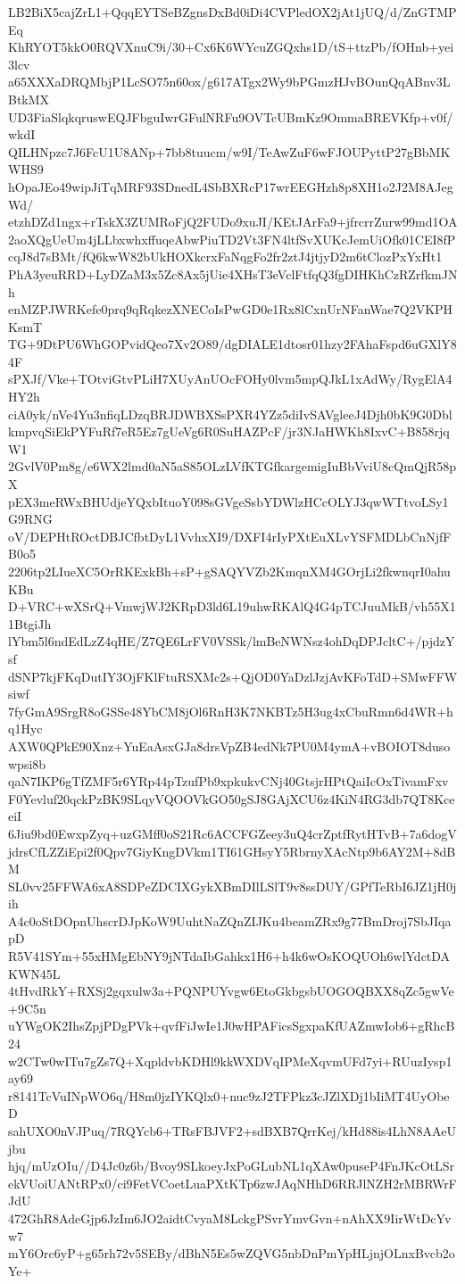 LB2BiX5cajZrL1+QqqEYTSeBZgnsDxBd0iDi4CVPledOX2jAt1jUQ/d/ZnGTMPEq
KhRYOT5kkO0RQVXnuC9i/30+Cx6K6WYcuZGQxhs1D/tS+ttzPb/fOHnb+yei3lcv
a65XXXaDRQMbjP1LcSO75n60ox/g617ATgx2Wy9bPGmzHJvBOunQqABnv3LBtkMX
UD3FiaSlqkqruswEQJFbguIwrGFulNRFu9OVTcUBmKz9OmmaBREVKfp+v0f/wkdI
QILHNpzc7J6FcU1U8ANp+7bb8tuucm/w9I/TeAwZuF6wFJOUPyttP27gBbMKWHS9
hOpaJEo49wipJiTqMRF93SDnedL4SbBXRcP17wrEEGHzh8p8XH1o2J2M8AJegWd/
etzhDZd1ngx+rTskX3ZUMRoFjQ2FUDo9xuJI/KEtJArFa9+jfrcrrZurw99md1OA
2aoXQgUeUm4jLLbxwhxffuqeAbwPiuTD2Vt3FN4ltfSvXUKcJemUiOfk01CEI8fP
cqJ8d7sBMt/fQ6kwW82bUkHOXkcrxFaNqgFo2fr2ztJ4jtjyD2m6tClozPxYxHt1
PhA3yeuRRD+LyDZaM3x5Zc8Ax5jUie4XHsT3eVclFtfqQ3fgDIHKhCzRZrfkmJNh
enMZPJWRKefe0prq9qRqkezXNECoIsPwGD0e1Rx8lCxnUrNFanWae7Q2VKPHKsmT
TG+9DtPU6WhGOPvidQeo7Xv2O89/dgDIALE1dtosr01hzy2FAhaFspd6uGXlY84F
sPXJf/Vke+TOtviGtvPLiH7XUyAnUOcFOHy0lvm5mpQJkL1xAdWy/RygElA4HY2h
ciA0yk/nVe4Yu3nfiqLDzqBRJDWBXSsPXR4YZz5diIvSAVgleeJ4Djh0bK9G0Dbl
kmpvqSiEkPYFuRf7eR5Ez7gUeVg6R0SuHAZPcF/jr3NJaHWKh8IxvC+B858rjqW1
2GvlV0Pm8g/e6WX2lmd0aN5aS85OLzLVfKTGfkargemigIuBbVviU8cQmQjR58pX
pEX3meRWxBHUdjeYQxbItuoY098sGVgeSsbYDWlzHCcOLYJ3qwWTtvoLSy1G9RNG
oV/DEPHtROctDBJCfbtDyL1VvhxXI9/DXFI4rIyPXtEuXLvYSFMDLbCnNjfFB0o5
2206tp2LIueXC5OrRKExkBh+sP+gSAQYVZb2KmqnXM4GOrjLi2fkwnqrI0ahuKBu
D+VRC+wXSrQ+VmwjWJ2KRpD3ld6L19uhwRKAlQ4G4pTCJuuMkB/vh55X11BtgiJh
lYbm5l6ndEdLzZ4qHE/Z7QE6LrFV0VSSk/lmBeNWNsz4ohDqDPJcltC+/pjdzYsf
dSNP7kjFKqDutIY3OjFKlFtuRSXMc2s+QjOD0YaDzlJzjAvKFoTdD+SMwFFWsiwf
7fyGmA9SrgR8oGSSe48YbCM8jOl6RnH3K7NKBTz5H3ug4xCbuRmn6d4WR+hq1Hyc
AXW0QPkE90Xnz+YuEaAsxGJa8drsVpZB4edNk7PU0M4ymA+vBOIOT8dusowpsi8b
qaN7IKP6gTfZMF5r6YRp44pTzufPb9xpkukvCNj40GtsjrHPtQaiIcOxTivamFxv
F0Yevluf20qckPzBK9SLqyVQOOVkGO50gSJ8GAjXCU6z4KiN4RG3db7QT8KceeiI
6Jiu9bd0EwxpZyq+uzGMff0oS21Rc6ACCFGZeey3uQ4crZptfRytHTvB+7a6dogV
jdrsCfLZZiEpi2f0Qpv7GiyKngDVkm1TI61GHsyY5RbrnyXAcNtp9b6AY2M+8dBM
SL0vv25FFWA6xA8SDPeZDCIXGykXBmDIlLSlT9v8ssDUY/GPfTeRbI6JZ1jH0jih
A4c0oStDOpnUhscrDJpKoW9UuhtNaZQnZIJKu4beamZRx9g77BmDroj7SbJIqapD
R5V41SYm+55xHMgEbNY9jNTdaIbGahkx1H6+h4k6wOsKOQUOh6wlYdctDAKWN45L
4tHvdRkY+RXSj2gqxulw3a+PQNPUYvgw6EtoGkbgsbUOGOQBXX8qZc5gwVe+9C5n
uYWgOK2IhsZpjPDgPVk+qvfFiJwIe1J0wHPAFicsSgxpaKfUAZmwIob6+gRhcB24
w2CTw0wITu7gZs7Q+XqpldvbKDHl9kkWXDVqIPMeXqvmUFd7yi+RUuzIysp1ay69
r8141TcVuINpWO6q/H8m0jzIYKQlx0+nuc9zJ2TFPkz3cJZlXDj1bIiMT4UyObeD
sahUXO0nVJPuq/7RQYcb6+TRsFBJVF2+sdBXB7QrrKej/kHd88is4LhN8AAeUjbu
hjq/mUzOIu//D4Jc0z6b/Bvoy9SLkoeyJxPoGLubNL1qXAw0puseP4FnJKcOtLSr
ekVUoiUANtRPx0/ci9FetVCoetLuaPXtKTp6zwJAqNHhD6RRJlNZH2rMBRWrFJdU
472GhR8AdeGjp6JzIm6JO2aidtCvyaM8LckgPSvrYmvGvn+nAhXX9IirWtDcYvw7
mY6Orc6yP+g65rh72v5SEBy/dBhN5Es5wZQVG5nbDnPmYpHLjnjOLnxBvcb2oYe+
